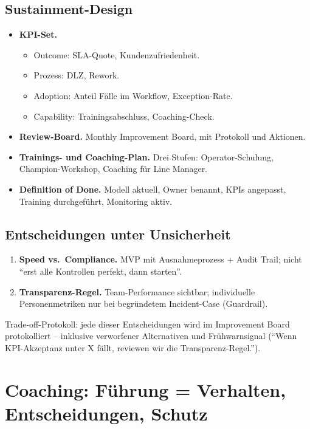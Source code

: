 \documentclass[11pt,a4paper,oneside]{article}
\begin{document}
\subsection{Sustainment-Design}

\begin{itemize}
  \item \textbf{KPI-Set.}
    \begin{itemize}
      \item Outcome: SLA-Quote, Kundenzufriedenheit.
      \item Prozess: DLZ, Rework.
      \item Adoption: Anteil Fälle im Workflow, Exception-Rate.
      \item Capability: Trainingsabschluss, Coaching-Check.
    \end{itemize}
  \item \textbf{Review-Board.} Monthly Improvement Board, mit Protokoll und Aktionen.
  \item \textbf{Trainings- und Coaching-Plan.} Drei Stufen: Operator-Schulung, Champion-Workshop, Coaching für Line Manager.
  \item \textbf{Definition of Done.} Modell aktuell, Owner benannt, KPIs angepasst, Training durchgeführt, Monitoring aktiv.
\end{itemize}

\subsection{Entscheidungen unter Unsicherheit}

\begin{enumerate}
  \item \textbf{Speed vs.\ Compliance.} MVP mit Ausnahmeprozess + Audit Trail; nicht ``erst alle Kontrollen perfekt, dann starten''.
  \item \textbf{Transparenz-Regel.} Team-Performance sichtbar; individuelle Personenmetriken nur bei begründetem Incident-Case (Guardrail).
\end{enumerate}

Trade-off-Protokoll: jede dieser Entscheidungen wird im Improvement Board protokolliert -- inklusive verworfener Alternativen und Frühwarnsignal (``Wenn KPI-Akzeptanz unter X fällt, reviewen wir die Transparenz-Regel.'').

\section{Coaching: Führung = Verhalten, Entscheidungen, Schutz}
\end{document}

